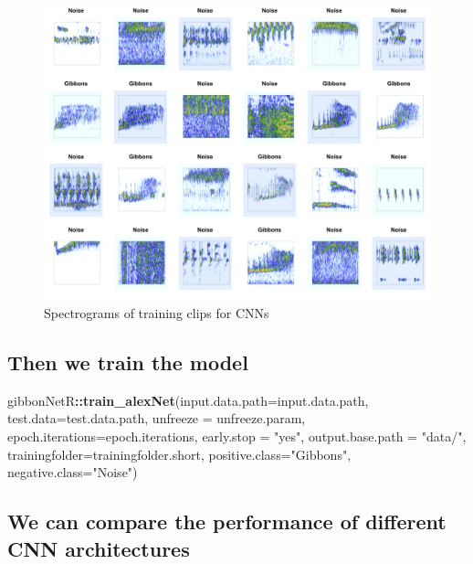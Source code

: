 \documentclass{article}
\newenvironment{Shaded}{\begin{snugshade}}{\end{snugshade}}
\newcommand{\AttributeTok}[1]{\textcolor[rgb]{0.13,0.29,0.53}{#1}}
\newcommand{\FunctionTok}[1]{\textcolor[rgb]{0.13,0.29,0.53}{\textbf{#1}}}
\newcommand{\NormalTok}[1]{#1}
\newcommand{\SpecialCharTok}[1]{\textcolor[rgb]{0.81,0.36,0.00}{\textbf{#1}}}
\newcommand{\StringTok}[1]{\textcolor[rgb]{0.31,0.60,0.02}{#1}}
\begin{document}
\begin{figure}[H]

{\centering \includegraphics[width=0.75\linewidth]{../../README_files/spectro} 

}

\caption{Spectrograms of training clips for CNNs}\label{fig:unnamed-chunk-1}
\end{figure}

\hypertarget{then-we-train-the-model}{%
\subsection{Then we train the model}\label{then-we-train-the-model}}

\begin{Shaded}
\begin{Highlighting}[]
\NormalTok{gibbonNetR}\SpecialCharTok{::}\FunctionTok{train\_alexNet}\NormalTok{(}\AttributeTok{input.data.path=}\NormalTok{input.data.path,}
                          \AttributeTok{test.data=}\NormalTok{test.data.path,}
                          \AttributeTok{unfreeze =}\NormalTok{ unfreeze.param,}
                          \AttributeTok{epoch.iterations=}\NormalTok{epoch.iterations,}
                          \AttributeTok{early.stop =} \StringTok{"yes"}\NormalTok{,}
                          \AttributeTok{output.base.path =} \StringTok{"data/"}\NormalTok{,}
                          \AttributeTok{trainingfolder=}\NormalTok{trainingfolder.short,}
                          \AttributeTok{positive.class=}\StringTok{"Gibbons"}\NormalTok{,}
                          \AttributeTok{negative.class=}\StringTok{"Noise"}\NormalTok{)}
\end{Highlighting}
\end{Shaded}

\hypertarget{we-can-compare-the-performance-of-different-cnn-architectures}{%
\subsection{We can compare the performance of different CNN
architectures}\label{we-can-compare-the-performance-of-different-cnn-architectures}}
\end{document}
